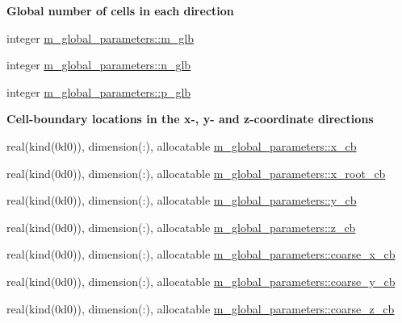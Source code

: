 \begin{Indent}\textbf{ Global number of cells in each direction}\par
\begin{DoxyCompactItemize}
\item 
integer \hyperlink{namespacem__global__parameters_ad4e160df8d0de7ea1801a1ca29f8e9b0}{m\+\_\+global\+\_\+parameters\+::m\+\_\+glb}
\item 
integer \hyperlink{namespacem__global__parameters_adab11dab474410541d4c37725bea01e1}{m\+\_\+global\+\_\+parameters\+::n\+\_\+glb}
\item 
integer \hyperlink{namespacem__global__parameters_a1072f221ca8e41b0ea3240b33374cc1e}{m\+\_\+global\+\_\+parameters\+::p\+\_\+glb}
\end{DoxyCompactItemize}
\end{Indent}
\begin{Indent}\textbf{ Cell-\/boundary locations in the x-\/, y-\/ and z-\/coordinate directions}\par
\begin{DoxyCompactItemize}
\item 
real(kind(0d0)), dimension(\+:), allocatable \hyperlink{namespacem__global__parameters_abd9ada93ee5222de406111ee9c91ddf0}{m\+\_\+global\+\_\+parameters\+::x\+\_\+cb}
\item 
real(kind(0d0)), dimension(\+:), allocatable \hyperlink{namespacem__global__parameters_a44deb07824e0bcefed07571e50258d19}{m\+\_\+global\+\_\+parameters\+::x\+\_\+root\+\_\+cb}
\item 
real(kind(0d0)), dimension(\+:), allocatable \hyperlink{namespacem__global__parameters_aa436c56a050419e85c8c08611a688e63}{m\+\_\+global\+\_\+parameters\+::y\+\_\+cb}
\item 
real(kind(0d0)), dimension(\+:), allocatable \hyperlink{namespacem__global__parameters_a1f932e794cad6291b2e6c62b93dcf533}{m\+\_\+global\+\_\+parameters\+::z\+\_\+cb}
\item 
real(kind(0d0)), dimension(\+:), allocatable \hyperlink{namespacem__global__parameters_aef538f2e7f1cb4a0072fba0794efec40}{m\+\_\+global\+\_\+parameters\+::coarse\+\_\+x\+\_\+cb}
\item 
real(kind(0d0)), dimension(\+:), allocatable \hyperlink{namespacem__global__parameters_a17215aa76b13fd4cf185945c445dc88f}{m\+\_\+global\+\_\+parameters\+::coarse\+\_\+y\+\_\+cb}
\item 
real(kind(0d0)), dimension(\+:), allocatable \hyperlink{namespacem__global__parameters_ac5e4f1860cfc9d58840a935de349811e}{m\+\_\+global\+\_\+parameters\+::coarse\+\_\+z\+\_\+cb}
\end{DoxyCompactItemize}
\end{Indent}
